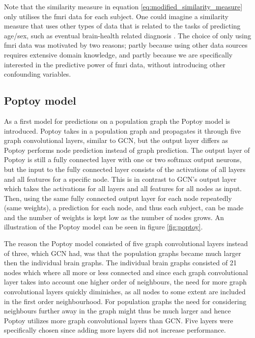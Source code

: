 Note that the similarity measure in equation \eqref{eq:modified_similarity_measure} only utilises the \acrshort{fmri} data for each subject. One could imagine a similarity measure that uses other types of data that is related to the tasks of predicting age/sex, such as eventual brain-health related diagnosis \cite{stankeviciute}. The choice of only using \acrshort{fmri} data was motivated by two reasons; partly because using other data sources requires extensive domain knowledge, and partly because we are specifically interested in the predictive power of \acrshort{fmri} data, without introducing other confounding variables.

\subsection{Poptoy model}
As a first model for predictions on a population graph the Poptoy model is introduced. Poptoy takes in a population graph and propagates it through five graph convolutional layers, similar to GCN, but the output layer differs as Poptoy performs node prediction instead of graph prediction. The output layer of Poptoy is still a fully connected layer with one or two softmax output neurons, but the input to the fully connected layer consists of the activations of all layers and all features for a specific node. This is in contrast to GCN's output layer which takes the activations for all layers and all features for all nodes as input. Then, using the same fully connected output layer for each node repeatedly (same weights), a prediction for each node, and thus each subject, can be made and the number of weights is kept low as the number of nodes grows. An illustration of the Poptoy model can be seen in figure \ref{fig:poptoy}.

The reason the Poptoy model consisted of five graph convolutional layers instead of three, which GCN had, was that the population graphs became much larger then the individual brain graphs. The individual brain graphs consisted of 21 nodes which where all more or less connected and since each graph convolutional layer takes into account one higher order of neighbours, the need for more graph convolutional layers quickly diminishes, as all nodes to some extent are included in the first order neighbourhood. For population graphs the need for considering neighbours further away in the graph might thus be much larger and hence Poptoy utilizes more graph convolutional layers than GCN. Five layers were specifically chosen since adding more layers did not increase performance.

